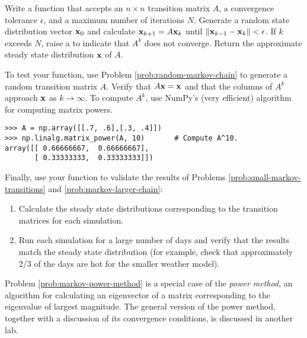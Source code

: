 \begin{problem} %
Write a function that accepts an $n\times n$ transition matrix $A$, a convergence tolerance $\epsilon$, and a maximum number of iterations $N$.
Generate a random state distribution vector $\mathbf{x}_{0}$ and calculate $\mathbf{x}_{k+1} = A\mathbf{x}_k$ until $\|\mathbf{x}_{k-1} - \mathbf{x}_k\| < \epsilon$.
If $k$ exceeds $N$, raise a  to indicate that $A^k$ does not converge.
Return the approximate steady state distribution $\mathbf{x}$ of $A$.

To test your function, use Problem \ref{prob:random-markov-chain} to generate a random transition matrix $A$.
Verify that $A\mathbf{x} = \mathbf{x}$ and that the columns of $A^k$ approach $\mathbf{x}$ as $k\rightarrow\infty$.
To compute $A^k$, use NumPy's (very efficient) algorithm for computing matrix powers. %

\begin{lstlisting}
>>> A = np.array([[.7, .6],[.3, .4]])
>>> np.linalg.matrix_power(A, 10)       # Compute A^10.
array([[ 0.66666667,  0.66666667],
       [ 0.33333333,  0.33333333]])
\end{lstlisting}

Finally, use your function to validate the results of Problems \ref{prob:small-markov-transitions} and \ref{prob:markov-larger-chain}:
\begin{enumerate}
    \item Calculate the steady state distributions corresponding to the transition matrices for each simulation.
    \item Run each simulation for a large number of days and verify that the results match the steady state distribution (for example, check that approximately 2/3 of the days are hot for the smaller weather model).
\end{enumerate}

\label{prob:markov-power-method}
\end{problem}

\begin{info}
Problem \ref{prob:markov-power-method} is a special case of the \emph{power method}, an algorithm for calculating an eigenvector of a matrix corresponding to the eigenvalue of largest magnitude.
The general version of the power method, together with a discussion of its convergence conditions, is discussed in another lab.
\end{info}

